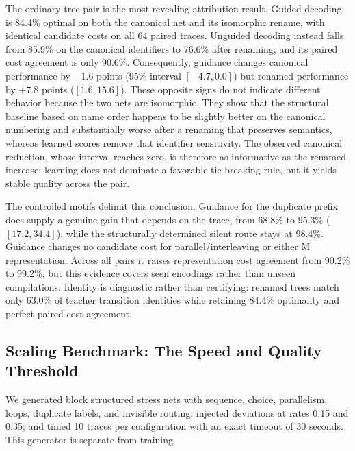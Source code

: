 \documentclass[manuscript,screen,nonacm]{acmart}
\begin{document}
The ordinary tree pair is the most revealing attribution result. Guided decoding is 84.4\% optimal on both the canonical net and its isomorphic rename, with identical candidate costs on all 64 paired traces. Unguided decoding instead falls from 85.9\% on the canonical identifiers to 76.6\% after renaming, and its paired cost agreement is only 90.6\%. Consequently, guidance changes canonical performance by $-1.6$ points (95\% interval $[-4.7,0.0]$) but renamed performance by $+7.8$ points ($[1.6,15.6]$). These opposite signs do not indicate different behavior because the two nets are isomorphic. They show that the structural baseline based on name order happens to be slightly better on the canonical numbering and substantially worse after a renaming that preserves semantics, whereas learned scores remove that identifier sensitivity. The observed canonical reduction, whose interval reaches zero, is therefore as informative as the renamed increase: learning does not dominate a favorable tie breaking rule, but it yields stable quality across the pair.

The controlled motifs delimit this conclusion. Guidance for the duplicate prefix does supply a genuine gain that depends on the trace, from 68.8\% to 95.3\% ($[17.2,34.4]$), while the structurally determined silent route stays at 98.4\%. Guidance changes no candidate cost for parallel/interleaving or either M representation. Across all pairs it raises representation cost agreement from 90.2\% to 99.2\%, but this evidence covers seen encodings rather than unseen compilations. Identity is diagnostic rather than certifying: renamed trees match only 63.0\% of teacher transition identities while retaining 84.4\% optimality and perfect paired cost agreement.

\subsection{Scaling Benchmark: The Speed and Quality Threshold}
\label{sec:scaling}

We generated block structured stress nets with sequence, choice, parallelism, loops, duplicate labels, and invisible routing; injected deviations at rates 0.15 and 0.35; and timed 10 traces per configuration with an exact timeout of 30 seconds. This generator is separate from training.
\end{document}
